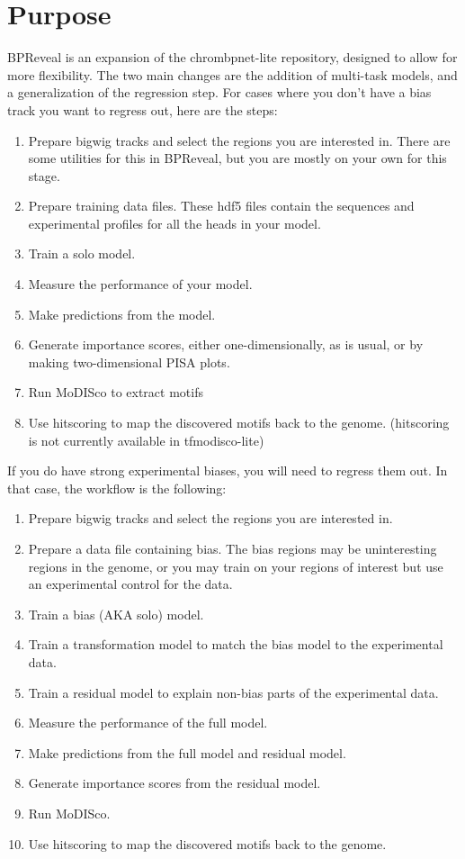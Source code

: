 \documentclass{article}
\begin{document}
\section{Purpose}

BPReveal is an expansion of the chrombpnet-lite repository, designed to allow for more flexibility. 
The two main changes are the addition of multi-task models, and a generalization of the regression step. 
For cases where you don't have a bias track you want to regress out, here are the steps: 

\begin{enumerate}
    \item Prepare bigwig tracks and select the regions you are interested in. There are some utilities for this in BPReveal, but you are mostly on your own for this stage. 
    \item Prepare training data files. These hdf5 files contain the sequences and experimental profiles for all the heads in your model.
    \item Train a solo model. 
    \item Measure the performance of your model. 
    \item Make predictions from the model.
    \item Generate importance scores, either one-dimensionally, as is usual, or by making two-dimensional PISA plots. 
    \item Run MoDISco to extract motifs
    \item Use hitscoring to map the discovered motifs back to the genome. (hitscoring is not currently available in tfmodisco-lite)
\end{enumerate}

If you do have strong experimental biases, you will need to regress them out. In that case, the workflow is the following:

\begin{enumerate}
    \item Prepare bigwig tracks and select the regions you are interested in.  
    \item Prepare a data file containing bias. The bias regions may be uninteresting regions in the genome, or you may train on your regions of interest but use an experimental control for the data. 
    \item Train a bias (AKA solo) model. 
    \item Train a transformation model to match the bias model to the experimental data. 
    \item Train a residual model to explain non-bias parts of the experimental data. 
    \item Measure the performance of the full model. 
    \item Make predictions from the full model and residual model.
    \item Generate importance scores from the residual model. 
    \item Run MoDISco. 
    \item Use hitscoring to map the discovered motifs back to the genome.
\end{enumerate}
\end{document}
